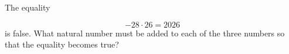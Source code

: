 The equality

\[
-28 \cdot 26 = 2026
\]is false. What natural number must be added to each of the three numbers so that the equality becomes true?
